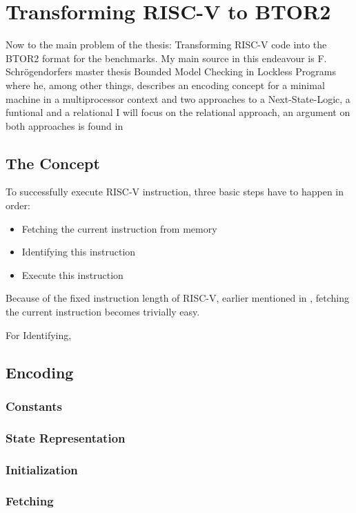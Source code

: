 \chapter{Transforming RISC-V to BTOR2}\label{chap:riscv_to_btor2}
Now to the main problem of the thesis: Transforming RISC-V code into the BTOR2
format for the benchmarks. My main source in this endeavour is F.
Schrögendorfers master thesis \dq Bounded Model Checking in Lockless
Programs\dq \cite{bmcOfLockless} where he, among other things, describes an
encoding concept for a minimal machine in a multiprocessor context
\cite[chapter 2]{bmcOfLockless} and two approaches to a Next-State-Logic, a
funtional \cite[Chapter 6]{bmcOfLockless} and a relational \cite[Chapter
    7]{bmcOfLockless} I will focus on the relational approach, an argument on both
approaches is found in 

\section{The Concept}
To successfully execute RISC-V instruction, three basic steps have to happen in
order:
\begin{itemize}
    \item Fetching the current instruction from memory
    \item Identifying this instruction
    \item Execute this instruction
\end{itemize}
Because of the fixed instruction length of RISC-V, earlier mentioned in , fetching the current instruction becomes trivially easy.

For Identifying,

\section{Encoding}
\subsection{Constants}
\subsection{State Representation}
\subsection{Initialization}
\subsection{Fetching}
